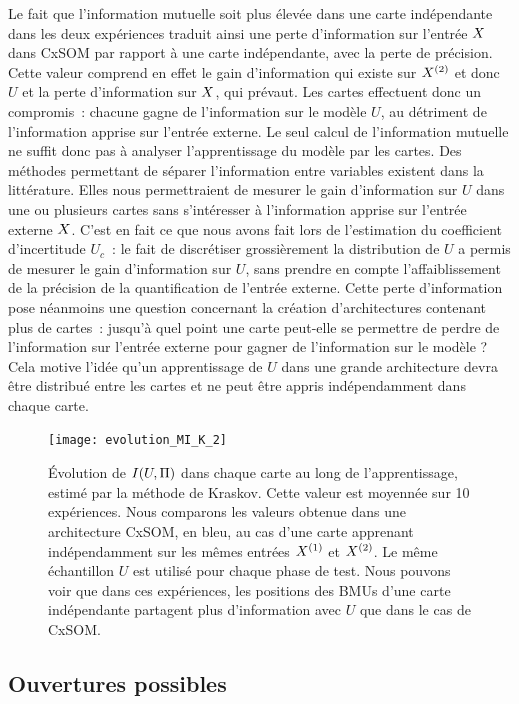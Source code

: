 \documentclass[../main]{subfiles}
\begin{document}
Le fait que l'information mutuelle soit plus élevée dans une carte indépendante dans les deux expériences traduit ainsi une perte d'information sur l'entrée $X$ dans CxSOM par rapport à une carte indépendante, avec la perte de précision. 
Cette valeur comprend en effet le gain d'information qui existe sur $X^{({2})}$ et donc $U$ et la perte d'information sur $X$, qui prévaut.
Les cartes effectuent donc un compromis~: chacune gagne de l'information sur le modèle $U$, au détriment de l'information apprise sur l'entrée externe.
Le seul calcul de l'information mutuelle ne suffit donc pas à analyser l'apprentissage du modèle par les cartes.
Des méthodes permettant de séparer l'information entre variables existent dans la littérature. Elles nous permettraient de mesurer le gain d'information sur $U$ dans une ou plusieurs cartes sans s'intéresser à l'information apprise sur l'entrée externe $X$.
C'est en fait ce que nous avons fait lors de l'estimation du coefficient d'incertitude $U_c$~: le fait de discrétiser grossièrement la distribution de $U$ a permis de mesurer le gain d'information sur $U$, sans prendre en compte l'affaiblissement de la précision de la quantification de l'entrée externe.
Cette perte d'information pose néanmoins une question concernant la création d'architectures contenant plus de cartes~: jusqu'à quel point une carte peut-elle se permettre de perdre de l'information sur l'entrée externe pour gagner de l'information sur le modèle ? 
Cela motive l'idée qu'un apprentissage de $U$ dans une grande architecture devra être distribué entre les cartes et ne peut être appris indépendamment dans chaque carte.

\begin{figure}
\centering\texttt{[image: evolution\_MI\_K\_2]}
\caption{\'Evolution de $I(U,\Pi)$ dans chaque carte au long de l'apprentissage, estimé par la méthode de Kraskov.
Cette valeur est moyennée sur 10 expériences. Nous comparons les valeurs obtenue dans une architecture CxSOM, en bleu, au cas d'une carte apprenant indépendamment sur les mêmes entrées $X^{({1})}$ et $X^{({2})}$.
Le même échantillon $U$ est utilisé pour chaque phase de test.
Nous pouvons voir que dans ces expériences, les positions des BMUs d'une carte indépendante partagent plus d'information avec $U$ que dans le cas de CxSOM. 
\label{fig:MI_evol_total}}
\end{figure}

\subsection{Ouvertures possibles}
\end{document}
